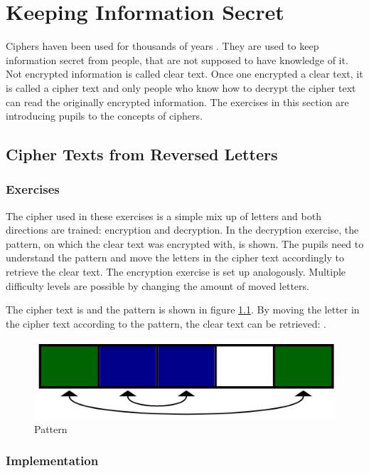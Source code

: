 \chapter{Keeping Information Secret}
\label{chapter:keepingInformationSecret}

Ciphers haven been used for thousands of years \cite{HistoryOfCryptography}. They are used to keep information secret from people, that are not supposed to have knowledge of it. Not encrypted information is called clear text. Once one encrypted a clear text, it is called a cipher text and only people who know how to decrypt the cipher text can read the originally encrypted information.
The exercises in this section are introducing pupils to the concepts of ciphers.

\section{Cipher Texts from Reversed Letters}
\label{section:patterns}

\subsection{Exercises}
The cipher used in these exercises is a simple mix up of letters and both directions are trained: encryption and decryption. In the decryption exercise, the pattern, on which the clear text was encrypted with, is shown. The pupils need to understand the pattern and move the letters in the cipher text accordingly to retrieve the clear text. The encryption exercise is set up analogously. Multiple difficulty levels are possible by changing the amount of moved letters.

\begin{example}
    The cipher text is  and the pattern is shown in figure \ref{fig:pattern}. By moving the letter in the cipher text according to the pattern, the clear text can be retrieved: .
\end{example}

\begin{figure} 
    \centering
    \includegraphics[width=0.4 \columnwidth]{figures/pattern.png}
    \caption{Pattern} 
    \label{fig:pattern} 
\end{figure}

\subsection{Implementation}

